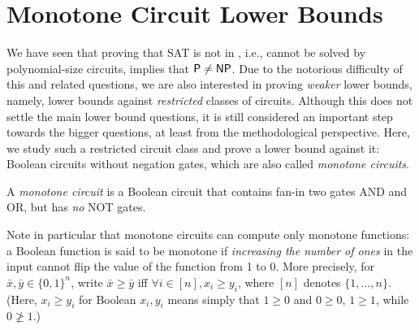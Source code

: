 %
%
%





\chapter{Monotone Circuit Lower Bounds}
\label{sec:Razborov} %



We have  seen that proving that SAT is not in \Ppoly, i.e., cannot  be solved by polynomial-size circuits, implies that ${\mathsf{P}} \neq {\ensuremath{\mathsf{NP}}}$.
Due to the notorious difficulty of this and related questions, we are also interested in proving \emph{weaker} lower bounds, namely, lower bounds against \emph{restricted} classes of circuits. Although this does not settle the main lower bound questions, it is still considered an important step towards the bigger questions, at least from the methodological perspective. 
Here, we study such a restricted circuit class and prove a lower bound against it: Boolean circuits without negation gates, which are also called \emph{ monotone circuits}.


\begin{definition}
A \emph{monotone circuit} is a Boolean circuit that contains fan-in two gates AND and OR, but has \emph{no} NOT gates.
\end{definition}

Note in particular that monotone circuits can compute only monotone functions: a Boolean function is said to be monotone if \emph{increasing the number of ones} in the input cannot flip the value of the function from 1 to 0. More precisely, for $\bar{x}, \bar{y} \in\{0,1\}^n$, write $\bar{x} \geq \bar{y}$ iff $ \forall i \in [n], x_i \geq y_i$, where $[n]$ denotes $\{1,\dots,n\}$. (Here, $x_i\ge y_i$ for Boolean $x_i,y_i$ means simply that $1\ge 0$ and $0\ge 0$, $1\ge 1$, while $0\not\ge 1$.)

